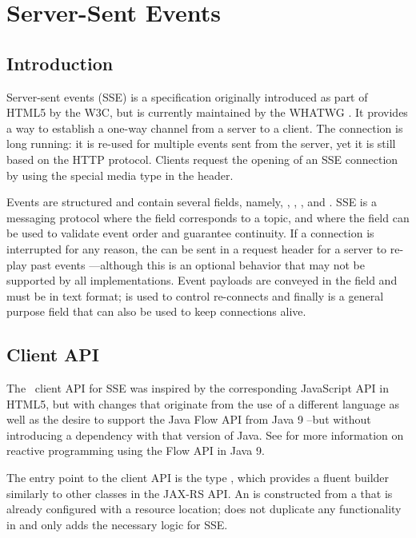 \chapter{Server-Sent Events}
\label{sse}

\section{Introduction}
\label{sse_introduction}

Server-sent events (SSE) is a specification originally introduced as part of HTML5 by the W3C, but is currently maintained by the WHATWG \cite{sse}. It provides a way to establish a one-way channel from a server to a client. The connection is long running: it is re-used for multiple events sent from the server, yet it is still based on the HTTP protocol. Clients request the opening of an SSE connection by using the special media type  in the  header.

Events are structured and contain several fields, namely, , , ,  and . SSE is a messaging protocol where the  field corresponds to a topic, and where the  field can be used to validate event order and guarantee continuity. If a connection is interrupted for any reason, the  can be sent in a request header for a server to re-play past events ---although this is an optional behavior that may not be supported by all implementations. Event payloads are conveyed in the  field and must be in text format;  is used to control re-connects and finally  is a general purpose field that can also be used to keep connections alive.

\section{Client API}
\label{sse_client_api}

The \jaxrs\ client API for SSE was inspired by the corresponding JavaScript API in HTML5, but with changes that originate from the use of a different language as well as the desire to support the Java Flow API from Java 9 --but without introducing a dependency with that version of Java. See \cite{java9flow} for more information on reactive programming using the Flow API in Java 9.

The entry point to the client API is the type , which provides a fluent builder similarly to other classes in the JAX-RS API. An  is constructed from a  that is already configured with a resource location;  does not duplicate any functionality in  and only adds the necessary logic for SSE. 

